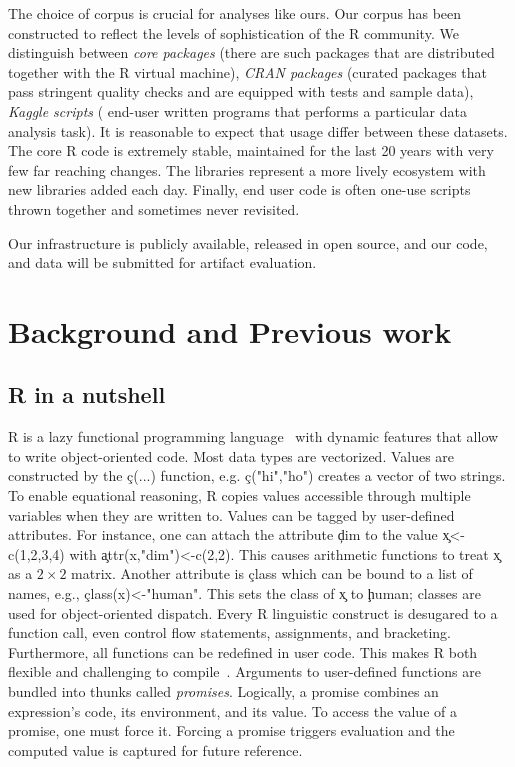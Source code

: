 \documentclass[USenglish,cleveref, autoref, thm-restate]{lipics-v2019}
\begin{document}
The choice of corpus is crucial for analyses like ours.  Our corpus
has been constructed to reflect the levels of sophistication of the R
community.  We distinguish between \emph{core packages} (there are
\CorpusCorePackages such packages that are distributed together with
the R virtual machine), \emph{CRAN packages} (\CorpusPackages curated
packages that pass stringent quality checks and are equipped with
tests and sample data), \emph{Kaggle scripts} (\CorpusFinishedKaggle
end-user written programs that performs a particular data analysis
task). It is reasonable to expect that \eval usage differ between
these datasets. The core R code is extremely stable, maintained for
the last 20 years with very few far reaching changes. The libraries
represent a more lively ecosystem with new libraries added each day.
Finally, end user code is often one-use scripts thrown together and
sometimes never revisited.

Our infrastructure is publicly available, released in open source, and
our code, and data will be submitted for artifact evaluation.

\section{Background and Previous work}


\subsection{R in a nutshell}

R is a lazy functional programming language~\cite{ecoop12} with
dynamic features that allow to write object-oriented code.  Most data
types are vectorized. Values are constructed by the \c{c(...)}
function, e.g. \c{c("hi","ho")} creates a vector of two strings.  To
enable equational reasoning, R copies values accessible through
multiple variables when they are written to.  Values can be tagged by
user-defined attributes. For instance, one can attach the attribute
\c{dim} to the value \c{x<-c(1,2,3,4)} with \c{attr(x,"dim")<-c(2,2)}.
This causes arithmetic functions to treat \c x as a $2 \times 2$
matrix. Another attribute is \c{class} which can be bound to a list of
names, e.g., \c{class(x)<-"human"}. This sets the class of \c{x} to
\c{human}; classes are used for object-oriented dispatch.  Every R
linguistic construct is desugared to a function call, even control
flow statements, assignments, and bracketing. Furthermore, all
functions can be redefined in user code. This makes R both flexible
and challenging to compile~\cite{dls19}.  Arguments to user-defined
functions are bundled into thunks called \emph{promises}. Logically, a
promise combines an expression's code, its environment, and its value.
To access the value of a promise, one must force it. Forcing a promise
triggers evaluation and the computed value is captured for future
reference.
\end{document}
